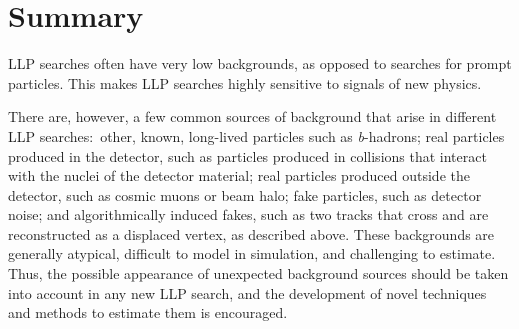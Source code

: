 \section{Summary}

LLP searches often have very low backgrounds, as opposed to searches for prompt particles. This makes LLP searches highly sensitive to signals of new physics.

There are, however, a few common sources of background that arise in different LLP searches:~other, known, long-lived particles such as \textit{b}-hadrons; real particles produced in the detector, such as particles produced in collisions that interact with the nuclei of the detector material; real particles produced outside the detector, such as cosmic muons or beam halo; fake particles, such as detector noise; and algorithmically induced fakes, such as two tracks that cross and are reconstructed as a displaced vertex, as described above. These backgrounds are generally atypical, difficult to model in simulation, and challenging to estimate. Thus, the possible appearance of unexpected background sources should be taken into account in any new LLP search, and the development of novel techniques and methods to estimate them is encouraged.
